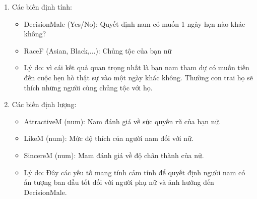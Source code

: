 \documentclass[a4paper,12pt]{article}
\begin{document}
		\begin{enumerate}[label = {\alph*)}]
			\item Các biến định tính:\\
			\begin{itemize}
				\item DecisionMale (Yes/No): Quyết dịnh nam có muốn 1 ngày hẹn nào khác không?
				\item RaceF (Asian, Black,...): Chủng tộc của bạn nữ
				\item[\textrightarrow] Lý do: vì cái kết quả quan trọng nhất là bạn nam tham dự có muốn tiến đến cuộc hẹn hò 
				thật sự vào một ngày khác không. Thường con trai họ sẽ thích những người cùng chủng tộc với họ.
			\end{itemize}
			
			
			\item Các biến định lượng:\\
			\begin{itemize}
				\item AttractiveM (num): Nam đánh giá về sức quyến rũ của bạn nữ.
				\item LikeM (num): Mức độ thích của người nam đối với nữ.
				\item SincereM (num): Mam đánh giá về độ chân thành của nữ.
				\item[\textrightarrow] Lý do: Đây các yếu tố mang tính cảm tính để quyết định người nam có ấn tượng ban đầu tốt đối với người phụ nữ và ảnh hưởng đến DecisionMale.
			\end{itemize}
		\end{enumerate}
	
\end{document}
